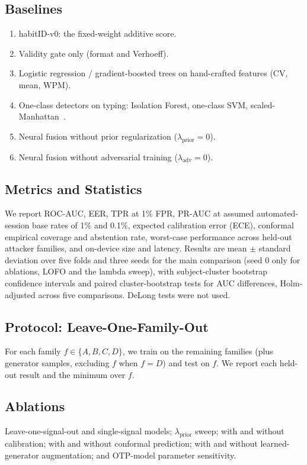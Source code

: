 \documentclass[conference]{IEEEtran}
\newcommand{\hid}{habitID}
\begin{document}
\subsection{Baselines}
\begin{enumerate}
\item \hid{}-v0: the fixed-weight additive score.
\item Validity gate only (format and Verhoeff).
\item Logistic regression / gradient-boosted trees on hand-crafted features (CV, mean, WPM).
\item One-class detectors on typing: Isolation Forest, one-class SVM, scaled-Manhattan~\cite{killourhy2009}.
\item Neural fusion without prior regularization ($\lambda_{\text{prior}}{=}0$).
\item Neural fusion without adversarial training ($\lambda_{\text{adv}}{=}0$).
\end{enumerate}

\subsection{Metrics and Statistics}
We report ROC-AUC, EER, TPR at 1\% FPR, PR-AUC at assumed automated-session base rates of 1\% and 0.1\%, expected calibration error (ECE), conformal empirical coverage and abstention rate, worst-case performance across held-out attacker families, and on-device size and latency. Results are mean $\pm$ standard deviation over five folds and three seeds for the main comparison (seed 0 only for ablations, LOFO and the lambda sweep), with subject-cluster bootstrap confidence intervals and paired cluster-bootstrap tests for AUC differences, Holm-adjusted across five comparisons. DeLong tests were not used.

\subsection{Protocol: Leave-One-Family-Out}
For each family $f\in\{A,B,C,D\}$, we train on the remaining families (plus generator samples, excluding $f$ when $f{=}D$) and test on $f$. We report each held-out result and the minimum over $f$.

\subsection{Ablations}
Leave-one-signal-out and single-signal models; $\lambda_{\text{prior}}$ sweep; with and without calibration; with and without conformal prediction; with and without learned-generator augmentation; and OTP-model parameter sensitivity.
\end{document}
